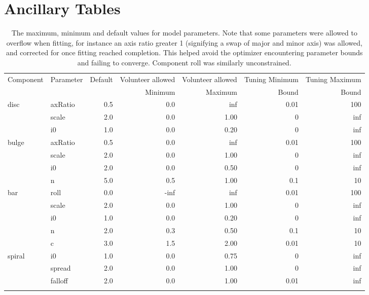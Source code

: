 \documentclass[../main.tex]{subfiles}
\begin{document}
\section{Ancillary Tables}
\begin{table}
  \centering
  \caption{The maximum, minimum and default values for model parameters. Note that some parameters were allowed to overflow when fitting, for instance an axis ratio greater 1 (signifying a swap of major and minor axis) was allowed, and corrected for once fitting reached completion. This helped avoid the optimizer encountering parameter bounds and failing to converge. Component roll was similarly unconstrained.}
  \begin{tabular}{l|l|r|r|r|r|r}
\hline
Component & Parameter &  Default &  Volunteer allowed &  Volunteer allowed & Tuning Minimum & Tuning Maximum \\
 &  &   &  Minimum &  Maximum & Bound & Bound \\
\hline
disc   & axRatio &      0.5 &       0.0 &      inf &       0.01   & 100   \\
       & scale   &      2.0 &       0.0 &     1.00 &       0      & inf   \\
       & i0      &      1.0 &       0.0 &     0.20 &       0      & inf   \\
bulge  & axRatio &      0.5 &       0.0 &      inf &       0.01   & 100   \\
       & scale   &      2.0 &       0.0 &     1.00 &       0      & inf   \\
       & i0      &      2.0 &       0.0 &     0.50 &       0      & inf   \\
       & n       &      5.0 &       0.5 &     1.00 &       0.1    & 10    \\
bar    & roll    &      0.0 &      -inf &      inf &       0.01   & 100   \\
       & scale   &      2.0 &       0.0 &     1.00 &       0      & inf   \\
       & i0      &      1.0 &       0.0 &     0.20 &       0      & inf   \\
       & n       &      2.0 &       0.3 &     0.50 &       0.1    & 10    \\
       & c       &      3.0 &       1.5 &     2.00 &       0.01   & 10    \\
spiral & i0      &      1.0 &       0.0 &     0.75 &       0      & inf   \\
       & spread  &      2.0 &       0.0 &     1.00 &       0      & inf   \\
       & falloff &      2.0 &       0.0 &     1.00 &       0.01   & inf   \\
\hline
  \centering
  \end{tabular}
  \label{table:bad_values}
\end{table}
\end{document}

